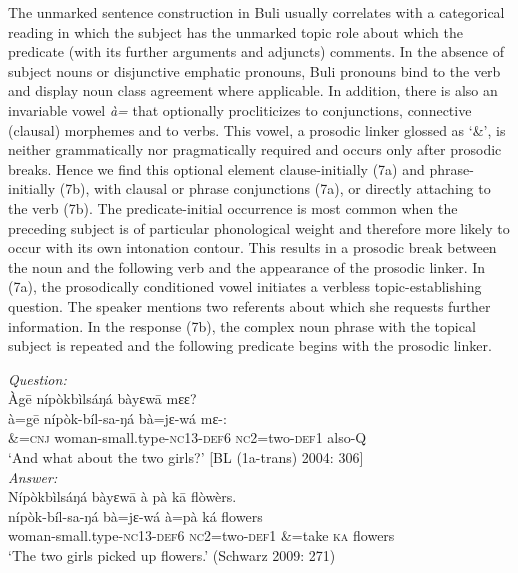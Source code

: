 \documentclass[output=paper]{langsci/langscibook}
\begin{document}
The unmarked sentence construction in Buli usually correlates with a categorical reading in which the subject has the unmarked topic role about which the predicate (with its further arguments and adjuncts) comments. In the absence of subject nouns or disjunctive emphatic pronouns, Buli pronouns bind to the verb and display noun class agreement where applicable. In addition, there is also an invariable vowel \textit{\`a=} that optionally procliticizes to conjunctions, connective (clausal) morphemes and to verbs. This vowel, a prosodic linker glossed as ‘\&’, is neither grammatically nor pragmatically required and occurs only after prosodic breaks. Hence we find this optional element clause-initially (7a) and phrase-initially (7b), with clausal or phrase conjunctions (7a), or directly attaching to the verb (7b). The predicate-initial occurrence is most common when the preceding subject is of particular phonological weight and therefore more likely to occur with its own intonation contour. This results in a prosodic break between the noun and the following verb and the appearance of the prosodic linker. In (7a), the prosodically conditioned vowel initiates a verbless topic-establishing question. The speaker mentions two referents about which she requests further information. In the response (7b), the complex noun phrase with the topical subject is repeated and the following predicate begins with the prosodic linker.  

\begin{exe}
	\ex\label{schwarz:7a}\begin{xlist}
		\ex \textit{Question:} \\ 
        \glll Àg\={e} {nípòkbìlsáŋá}    {bàyɛw\={a}}    {mɛɛ?} \\
			\textup{à=g\={e}}  {nípòk-bíl-sa-ŋá}      {bà=jɛ-wá}    {mɛ-:}\\
			\&=\textsc{cnj}  woman-small.type-\textsc{nc}13-\textsc{def}6  \textsc{nc}2=two-\textsc{def}1  also-\textsc{Q}\\
\glt   ‘And what about the two girls?’ [BL (1a-trans) 2004: 306] \\
		\ex \textit{Answer:} \\
        \glll Nípòkbìlsáŋá  bàyɛw\={a}  {à pà}  k\={a}  flòwèrs.\\
			 nípòk-bíl-sa-ŋá  bà=jɛ-wá  à=pà  ká  flowers\\
			woman-small.type-\textsc{nc}13-\textsc{def}6  \textsc{nc}2=two-\textsc{def}1  \&=take  \textsc{ka}  flowers\\
    \glt ‘The two girls picked up flowers.’ (Schwarz 2009: 271)
	\end{xlist}
\end{exe}
\end{document}
